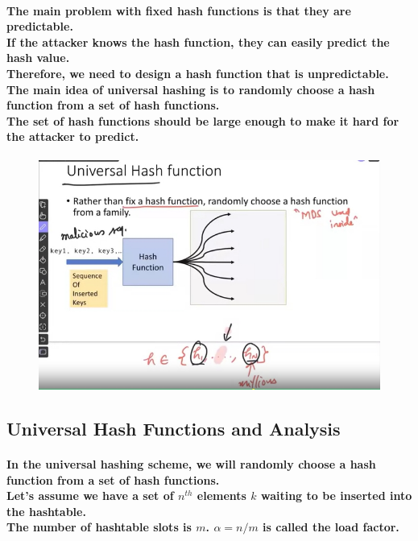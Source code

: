 \documentclass{article}
\begin{document}
\paragraph{The main problem with fixed hash functions is that they are predictable.\\
If the attacker knows the hash function, they can easily predict the hash value.\\
Therefore, we need to design a hash function that is unpredictable.\\
The main idea of universal hashing is to randomly choose a hash function from a set of hash functions.\\
The set of hash functions should be large enough to make it hard for the attacker to predict.\\}

\begin{figure}[H]
    \includegraphics[width=\textwidth]{universalhashfunction.png}
\end{figure}

\subsection{Universal Hash Functions and Analysis}

\paragraph{In the universal hashing scheme, we will randomly choose a hash function from a set of hash functions.\\
Let's assume we have a set of $n^{th}$ elements $k$ waiting to be inserted into the hashtable.\\
The number of hashtable slots is $m$. $\alpha = n/m$ is called the load factor.\\}
\end{document}
